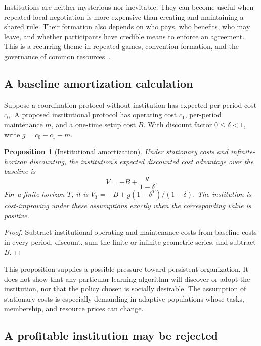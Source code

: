 \documentclass[11pt,letterpaper]{article}
\theoremstyle{plain}
\newtheorem{proposition}{Proposition}[section]
\theoremstyle{definition}
\theoremstyle{remark}
\begin{document}
Institutions are neither mysterious nor inevitable. They can become useful when repeated local negotiation is more expensive than creating and maintaining a shared rule. Their formation also depends on who pays, who benefits, who may leave, and whether participants have credible means to enforce an agreement. This is a recurring theme in repeated games, convention formation, and the governance of common resources~\cite{fudenbergmaskin,shoham,ostrombook}.

\subsection{A baseline amortization calculation}

Suppose a coordination protocol without institution has expected per-period cost $c_0$. A proposed institutional protocol has operating cost $c_1$, per-period maintenance $m$, and a one-time setup cost $B$. With discount factor $0\le\delta<1$, write $g=c_0-c_1-m$.

\begin{proposition}[Institutional amortization]\label{prop:amort}
Under stationary costs and infinite-horizon discounting, the institution's expected discounted cost advantage over the baseline is
\begin{equation}\label{eq:amort}
V=-B+\frac{g}{1-\delta}.
\end{equation}
For a finite horizon $T$, it is $V_T=-B+g(1-\delta^T)/(1-\delta)$. The institution is cost-improving under these assumptions exactly when the corresponding value is positive.
\end{proposition}
\begin{proof}
Subtract institutional operating and maintenance costs from baseline costs in every period, discount, sum the finite or infinite geometric series, and subtract $B$.
\end{proof}

This proposition supplies a possible pressure toward persistent organization. It does not show that any particular learning algorithm will discover or adopt the institution, nor that the policy chosen is socially desirable. The assumption of stationary costs is especially demanding in adaptive populations whose tasks, membership, and resource prices can change.

\subsection{A profitable institution may be rejected}
\end{document}
